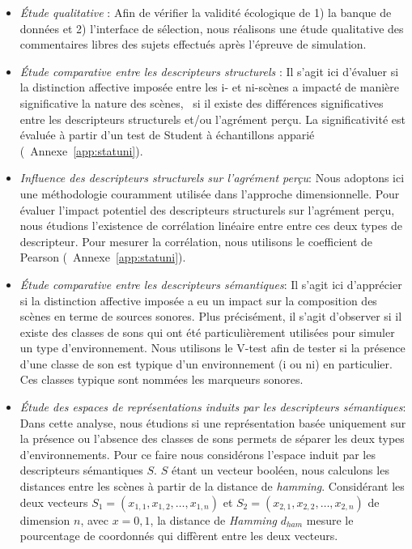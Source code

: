 \begin{itemize}
\item \emph{Étude qualitative} : Afin de vérifier la validité écologique de 1) la banque de données et 2) l'interface de sélection, nous réalisons une étude qualitative des commentaires libres des sujets effectués après l'épreuve de simulation.
\item \emph{Étude comparative entre les descripteurs structurels} : Il s'agit ici d'évaluer si la distinction affective imposée entre les i- et ni-scènes a impacté de manière significative la nature des scènes, \ie~si il existe des différences significatives entre les descripteurs structurels et/ou l'agrément perçu. La significativité est évaluée à partir d'un test de Student à échantillons apparié (\Cf~Annexe~\ref{app:statuni}).
\item \emph{Influence des descripteurs structurels sur l'agrément perçu}: Nous adoptons ici une méthodologie couramment utilisée dans l'approche dimensionnelle. Pour évaluer l'impact potentiel des descripteurs structurels sur l'agrément perçu, nous étudions l'existence de corrélation linéaire entre entre ces deux types de descripteur. Pour mesurer la corrélation, nous utilisons le coefficient de Pearson (\Cf~Annexe~\ref{app:statuni}).
\item \emph{Étude comparative entre les descripteurs sémantiques}: Il s'agit ici d'apprécier si la distinction affective imposée a eu un impact sur la composition des scènes en terme de sources sonores. Plus précisément, il s'agit d'observer si il existe des classes de sons qui ont été particulièrement utilisées pour simuler un type d'environnement. Nous utilisons le V-test afin de tester si la présence d'une classe de son est typique d'un environnement (i ou ni) en particulier. Ces classes typique sont nommées les marqueurs sonores.\\
\item \emph{Étude des espaces de représentations induits par les descripteurs sémantiques}: Dans cette analyse, nous étudions si une représentation basée uniquement sur la présence ou l'absence des classes de sons permets de séparer les deux types d'environnements. Pour ce faire nous considérons l'espace induit par les descripteurs sémantiques $S$. $S$ étant un vecteur booléen, nous calculons les distances entre les scènes à partir de la distance de \emph{hamming}. Considérant les deux vecteurs $S_1=(x_{1,1},x_{1,2},\ldots,x_{1,n})$ et $S_2=(x_{2,1},x_{2,2},\ldots,x_{2,n})$ de dimension $n$, avec $x={0,1}$, la distance de \emph{Hamming} $d_{ham}$ mesure le pourcentage de coordonnés qui diffèrent entre les deux vecteurs. 



\end{itemize}
